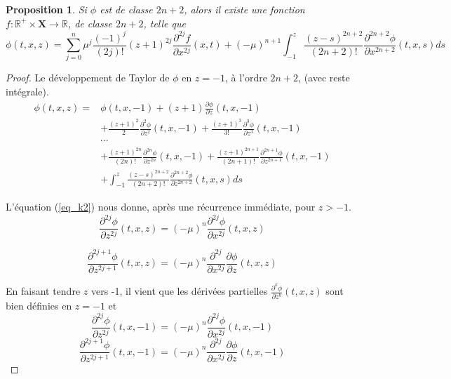 \documentclass[12pt,a4paper]{article}
\newtheorem{prop}[dfn]{\textbf{Proposition}}
\numberwithin{equation}{section}
\begin{document}
\begin{prop}
    Si $\phi$ est de classe $2n+2$, alors il existe une fonction $f:\mathbb{R}^+\times\textbf{X}\rightarrow \mathbb{R}$, de classe $2n+2$, telle que
    \begin{equation}
        \phi (t,x,z) = \sum_{j = 0}^{n} \mu^j\frac{(-1)^j}{(2j)!} (z+1)^{2j}\frac{\partial^{2j}f}{\partial x^{2j}}(x,t)
        + (-\mu)^{n+1}\int_{-1}^z\frac{(z-s)^{2n+2}}{(2n+2)!}\frac{\partial^{2n+2} \phi}{\partial x^{2n+2}}(t,x,s)ds
    \end{equation}
\end{prop}
\begin{proof}
Le développement de Taylor de $\phi$ en $z = -1$, à l'ordre $2n+2$, (avec reste intégrale).
\begin{equation*}
\begin{split}
    \phi(t,x,z) = &\phi(t,x,-1) + (z+1)\frac{\partial \phi}{\partial z}(t,x,-1)\\
    &+ \frac{(z+1)^2}{2}\frac{\partial^2 \phi}{\partial z^2}(t,x,-1) + \frac{(z+1)^3}{3!}\frac{\partial^3 \phi}{\partial z^3}(t,x,-1)\\
    & \cdots\\
    &+ \frac{(z+1)^{2n}}{(2n)!}\frac{\partial^{2n} \phi}{\partial z^{2n}}(t,x,-1) + \frac{(z+1)^{2n+1}}{(2n+1)!}\frac{\partial^{2n+1} \phi}{\partial z^{2n+1}}(t,x,-1)\\
    &+\int_{-1}^z\frac{(z-s)^{2n+2}}{(2n+2)!}\frac{\partial^{2n+2} \phi}{\partial z^{2n+2}}(t,x,s)ds
\end{split}
\end{equation*}

L'équation (\ref{eq_k2}) nous donne, après une récurrence immédiate, pour $z>-1$.
\begin{equation*}
    \frac{\partial^{2j} \phi}{\partial z^{2j}}(t,x,z) = (-\mu)^{n}\frac{\partial^{2j} \phi}{\partial x^{2j}}(t,x,z)
\end{equation*}

\begin{equation*}
    \frac{\partial^{2j+1} \phi}{\partial z^{2j+1}}(t,x,z) = (-\mu)^{n}\frac{\partial^{2j}}{\partial x^{2j}}\frac{\partial \phi}{\partial z}(t,x,z)
\end{equation*}

En faisant tendre $z$ vers -1, il vient que les dérivées partielles $\frac{\partial^{k} \phi}{\partial z^{k}}(t,x,z)$ sont bien définies en $z = -1$ et 
\begin{equation*}
    \frac{\partial^{2j} \phi}{\partial z^{2j}}(t,x,-1) = (-\mu)^{n}\frac{\partial^{2j} \phi}{\partial x^{2j}}(t,x,-1)
\end{equation*}
\begin{equation*}
    \frac{\partial^{2j+1} \phi}{\partial z^{2j+1}}(t,x,-1) = (-\mu)^{n}\frac{\partial^{2j}}{\partial x^{2j}}\frac{\partial \phi}{\partial z}(t,x,-1)
\end{equation*}


\end{proof}
\end{document}
